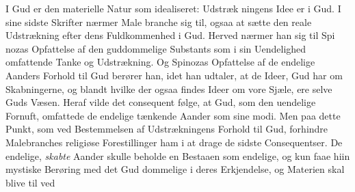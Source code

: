 \documentclass[12pt,a4paper]{book}
\begin{document}
I Gud er den materielle Natur som idealiseret: Udstræk\-%
ningens Idee er i Gud. I sine sidste Skrifter nærmer Male\-%
branche sig til, ogsaa at sætte den reale Udstrækning efter
dens Fuldkommenhed i Gud. Herved nærmer han sig til Spi\-%
nozas Opfattelse af den guddommelige Substants som i sin
Uendelighed omfattende Tanke og Udstrækning. Og Spinozas
Opfattelse af de endelige Aanders Forhold til Gud berører han,
idet han udtaler, at de Ideer, Gud har om Skabningerne, og
blandt hvilke der ogsaa findes Ideer om vore Sjæle, ere selve
Guds Væsen. Heraf vilde det consequent følge, at Gud, som
den uendelige Fornuft, omfattede de endelige tænkende Aander
som sine modi. Men paa dette Punkt, som ved Bestemmelsen
af Udstrækningens Forhold til Gud, forhindre Malebranches
religiøse Forestillinger ham i at drage de sidste Consequentser.
De endelige, \emph{skabte} Aander skulle beholde en Bestaaen som
endelige, og kun faae hiin mystiske Berøring med det Gud\-%
dommelige i deres Erkjendelse, og Materien skal blive til ved
%
\end{document}
